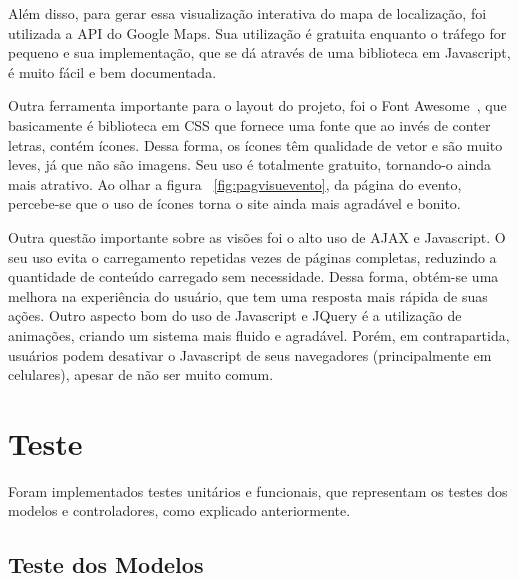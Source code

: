 Além disso, para gerar essa visualização interativa do mapa de localização, foi utilizada a API do Google Maps. Sua utilização é gratuita enquanto o tráfego for pequeno e sua implementação, que se dá através de uma biblioteca em Javascript, é muito fácil e bem documentada.

Outra ferramenta importante para o layout do projeto, foi o Font Awesome~\cite{font_awesome}, que basicamente é biblioteca em CSS que fornece uma fonte que ao invés de conter letras, contém ícones. Dessa forma, os ícones têm qualidade de vetor e são muito leves, já que não são imagens. Seu uso é totalmente gratuito, tornando-o ainda mais atrativo. Ao olhar a figura ~\ref{fig:pagvisuevento}, da página do evento, percebe-se que o uso de ícones torna o site ainda mais agradável e bonito.

Outra questão importante sobre as visões foi o alto uso de AJAX e Javascript. O seu uso evita o carregamento repetidas vezes de páginas completas, reduzindo a quantidade de conteúdo carregado sem necessidade. Dessa forma, obtém-se uma melhora na experiência do usuário, que tem uma resposta mais rápida de suas ações. Outro aspecto bom do uso de Javascript e JQuery é a utilização de animações, criando um sistema mais fluido e agradável. Porém, em contrapartida, usuários podem desativar o Javascript de seus navegadores (principalmente em celulares), apesar de não ser muito comum.

\section{Teste}

Foram implementados testes unitários e funcionais, que representam os testes dos modelos e controladores, como explicado anteriormente.

\subsection{Teste dos Modelos}

